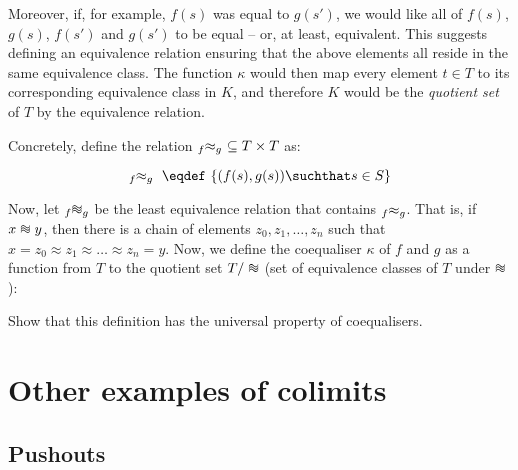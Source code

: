 Moreover, if, for example, $f(s)$ was equal to $g(s')$, we would like all of
$f(s)$, $g(s)$, $f(s')$ and $g(s')$ to be equal -- or, at least, equivalent.
This suggests defining an equivalence relation ensuring that the above elements
all reside in the same equivalence class. The function $\kappa$ would then map
every element $t \in T$ to its corresponding equivalence class in $K$, and
therefore $K$ would be the \emph{quotient set} of $T$ by the equivalence
relation.

Concretely, define the relation $ {}_{f}\hspace{-3px}\approx_{g}\ \subseteq T
\times T$ as:

\begin{equation*}
    {}_{f}\hspace{-3px}\approx_{g}\ \eqdef\ \{(f(s), g(s)) \suchthat s \in S\}
\end{equation*}

Now, let ${}_{f}\hspace{-3px}\threesim_{g}$ be the least equivalence relation
that contains ${}_{f}\hspace{-3px}\approx_{g}$. That is, if $x \threesim y$,
then there is a chain of elements $z_0, z_1, \ldots, z_n$ such that $x = z_0
\approx z_1 \approx \ldots \approx z_n = y$. Now, we define the coequaliser
$\kappa$ of $f$ and $g$ as a function from $T$ to the quotient set $T /
\threesim$ (set of equivalence classes of $T$ under $\threesim$):

\begin{center}
\end{center}

\begin{exercise}
    Show that this definition has the universal property of coequalisers.
\end{exercise}

\section{Other examples of colimits}

\subsection{Pushouts}

